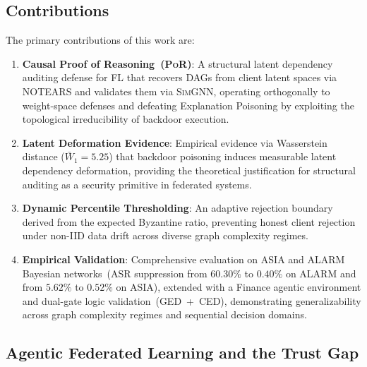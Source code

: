 \documentclass[journal]{IEEEtran}
\newcommand{\por}{\textsc{PoR}}
\newcommand{\simgnn}{\textsc{SimGNN}}
\newcommand{\notears}{\textsc{NOTEARS}}
\begin{document}
\subsection{Contributions}

The primary contributions of this work are:

\begin{enumerate}
  \setlength{\itemsep}{6pt plus 1pt}
  \setlength{\parsep}{3pt}
  \setlength{\topsep}{4pt}
  \item \textbf{Causal Proof of Reasoning~(\por{})}: A structural latent
        dependency auditing defense for FL that recovers DAGs from client
        latent spaces via \notears{} and validates them via \simgnn{},
        operating orthogonally to weight-space defenses and defeating
        Explanation Poisoning by exploiting the topological irreducibility
        of backdoor execution.

  \item \textbf{Latent Deformation Evidence}: Empirical evidence via
        Wasserstein distance ($\bar{W}_1 = 5.25$) that backdoor poisoning
        induces measurable latent dependency deformation, providing the
        theoretical justification for structural auditing as a security
        primitive in federated systems.

  \item \textbf{Dynamic Percentile Thresholding}: An adaptive rejection
        boundary derived from the expected Byzantine ratio, preventing
        honest client rejection under non-IID data drift across diverse
        graph complexity regimes.

  \item \textbf{Empirical Validation}: Comprehensive evaluation on ASIA
        and ALARM Bayesian networks~(ASR suppression from $60.30\%$ to
        $0.40\%$ on ALARM and from $5.62\%$ to $0.52\%$ on ASIA), extended
        with a Finance agentic environment and dual-gate logic
        validation~(GED~+~CED), demonstrating generalizability across
        graph complexity regimes and sequential decision domains.
\end{enumerate}

\subsection{Agentic Federated Learning and the Trust Gap}
\label{sec:agentic}
\end{document}
